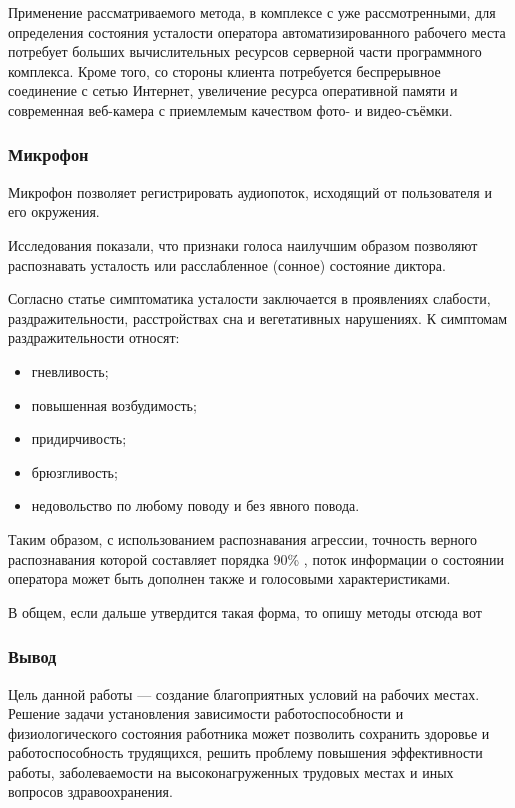 Применение рассматриваемого метода, в комплексе с уже рассмотренными, для определения состояния усталости оператора автоматизированного рабочего места потребует больших вычислительных ресурсов серверной части программного комплекса. Кроме того, со стороны клиента потребуется беспрерывное соединение с сетью Интернет, увеличение ресурса оперативной памяти и современная веб-камера с приемлемым качеством фото- и видео-съёмки.

\subsubsection{Микрофон}
Микрофон позволяет регистрировать аудиопоток, исходящий от пользователя и его окружения.

Исследования \cite{recognitionOfPsycho} показали, что признаки голоса наилучшим образом позволяют распознавать усталость или расслабленное (сонное) состояние диктора. 

Согласно статье \cite{medObozr} симптоматика усталости заключается в проявлениях слабости, раздражительности, расстройствах сна и вегетативных нарушениях. К симптомам раздражительности относят:
\begin{itemize}[leftmargin=1.6\parindent]
\item гневливость;
\item повышенная возбудимость;
\item придирчивость;
\item брюзгливость;
\item недовольство по любому поводу и без явного повода.
\end{itemize}

Таким образом, с использованием распознавания агрессии, точность верного распознавания которой составляет порядка 90\% \cite{recognitionOfPsycho}, поток информации о состоянии оператора может быть дополнен также и голосовыми характеристиками.

В общем, если дальше утвердится такая форма, то опишу методы отсюда вот\cite{voiceMethod}

\subsubsection*{Вывод}
Цель данной работы --- создание благоприятных условий на рабочих местах. Решение задачи установления зависимости работоспособности и физиологического состояния работника может позволить сохранить здоровье и работоспособность трудящихся, решить проблему повышения эффективности работы, заболеваемости на высоконагруженных трудовых местах и иных вопросов здравоохранения.


\pagebreak